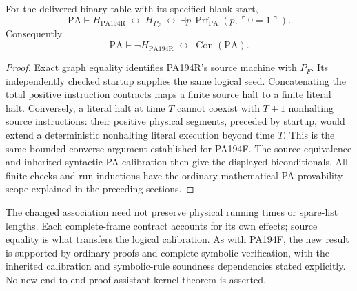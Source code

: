 \begin{theorem}
For the delivered binary table with its specified blank start,
\[
 \mathrm{PA}\vdash
 H_{\mathrm{PA194R}}
 \ \longleftrightarrow\ H_{P_F}
 \ \longleftrightarrow\
 \exists p\,\operatorname{Prf}_{\mathrm{PA}}
                         (p,\ulcorner0=1\urcorner).
\]
Consequently
\[
 \mathrm{PA}\vdash
 \neg H_{\mathrm{PA194R}}\ \longleftrightarrow\
                       \operatorname{Con}(\mathrm{PA}).
\]
\end{theorem}
\begin{proof}
Exact graph equality identifies PA194R's source machine with $P_F$.
Its independently checked startup supplies the same logical seed.
Concatenating the total positive instruction contracts maps a finite
source halt to a finite literal halt. Conversely, a literal halt at
time $T$ cannot coexist with $T+1$ nonhalting source instructions:
their positive physical segments, preceded by startup, would extend a
deterministic nonhalting literal execution beyond time $T$. This is the
same bounded converse argument established for PA194F. The source
equivalence and inherited syntactic PA calibration then give the displayed
biconditionals. All finite checks and run inductions have the ordinary
mathematical PA-provability scope explained in the preceding sections.
\end{proof}

The changed association need not preserve physical running times or
spare-list lengths. Each complete-frame contract accounts for its own
effects; source equality is what transfers the logical calibration.
As with PA194F, the new result is supported by ordinary proofs and
complete symbolic verification, with the inherited calibration and
symbolic-rule soundness dependencies stated explicitly. No new
end-to-end proof-assistant kernel theorem is asserted.
